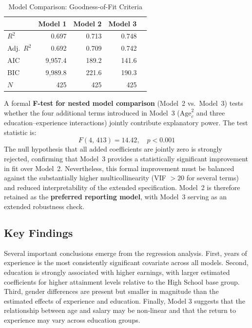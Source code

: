 \documentclass[12pt, a4paper]{article}
\begin{document}
\begin{table}[htpb]
\centering
\caption{Model Comparison: Goodness-of-Fit Criteria}
\label{tab:model_compare}
\begin{tabular}{lrrrr}
\toprule
& \textbf{Model 1} & \textbf{Model 2} & \textbf{Model 3} \\
\midrule
$R^2$ & 0.697 & 0.713 & 0.748 \\
Adj.\ $R^2$ & 0.692 & 0.709 & 0.742 \\
AIC & 9{,}957.4 & 189.2 & 141.6 \\
BIC & 9{,}989.8 & 221.6 & 190.3 \\
$N$ & 425 & 425 & 425 \\
\bottomrule
\end{tabular}
\end{table}

A formal \textbf{F-test for nested model comparison} (Model~2 vs.\ Model~3) tests whether the four additional terms introduced in Model~3 ($\text{Age}_c^2$ and three education--experience interactions) jointly contribute explanatory power. The test statistic is:
\[
  F(4,\,413) = 14.42, \quad p < 0.001
\]
The null hypothesis that all added coefficients are jointly zero is strongly rejected, confirming that Model~3 provides a statistically significant improvement in fit over Model~2. Nevertheless, this formal improvement must be balanced against the substantially higher multicollinearity (VIF $> 20$ for several terms) and reduced interpretability of the extended specification. Model~2 is therefore retained as the \textbf{preferred reporting model}, with Model~3 serving as an extended robustness check.

\subsection{Key Findings}
Several important conclusions emerge from the regression analysis.
First, years of experience is the most consistently significant covariate across all models.
Second, education is strongly associated with higher earnings, with larger estimated coefficients for higher attainment levels relative to the High School base group.
Third, gender differences are present but smaller in magnitude than the estimated effects of experience and education.
Finally, Model 3 suggests that the relationship between age and salary may be non-linear and that the return to experience may vary across education groups.

\end{document}
